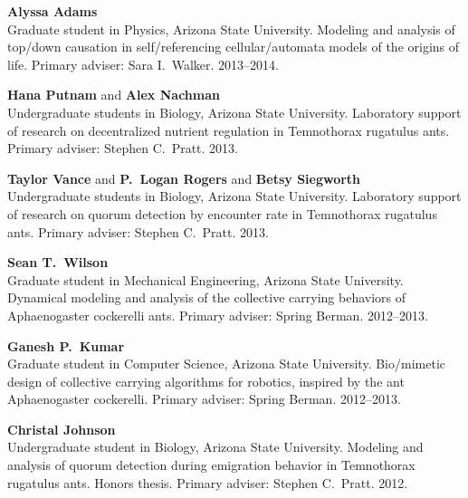 \documentclass[10pt]{article}
\renewcommand\emph[1]{#1}
\begin{document}
\begin{bibsection}

    \item \textbf{Alyssa Adams}\\
        Graduate student in Physics, Arizona State University.
        Modeling and analysis of top\-/down causation in
        self\-/referencing cellular\-/automata models of the origins of
        life.
        Primary adviser: Sara I.~Walker.
        2013--2014.

    \item \textbf{Hana Putnam} and \textbf{Alex Nachman}\\
        Undergraduate students in Biology, Arizona State University.
        Laboratory support of research on decentralized nutrient
        regulation in \emph{Temnothorax rugatulus} ants.
        Primary adviser: Stephen C.~Pratt.
        2013.

    \item \textbf{Taylor Vance} and \textbf{P.~Logan Rogers}
        and \textbf{Betsy Siegworth}\\
        Undergraduate students in Biology, Arizona State University.
        Laboratory support of research on quorum detection by encounter
        rate in \emph{Temnothorax rugatulus} ants.
        Primary adviser: Stephen C.~Pratt.
        2013.

    \item \textbf{Sean T.~Wilson}\\
        Graduate student in Mechanical Engineering, Arizona State University.
        Dynamical modeling and analysis of the collective carrying
        behaviors of \emph{Aphaenogaster cockerelli} ants.
        Primary adviser: Spring Berman.
        2012--2013.

    \item \textbf{Ganesh P.~Kumar}\\
        Graduate student in Computer Science, Arizona State University.
        Bio\-/mimetic design of collective carrying algorithms for
        robotics, inspired by the ant \emph{Aphaenogaster cockerelli}.
        Primary adviser: Spring Berman.
        2012--2013.

    \item \textbf{Christal Johnson}\\
        Undergraduate student in Biology, Arizona State University.
        Modeling and analysis of quorum detection during emigration
        behavior in \emph{Temnothorax rugatulus} ants. Honors thesis.
        Primary adviser: Stephen C.~Pratt.
        2012.


\end{bibsection}
\end{document}
